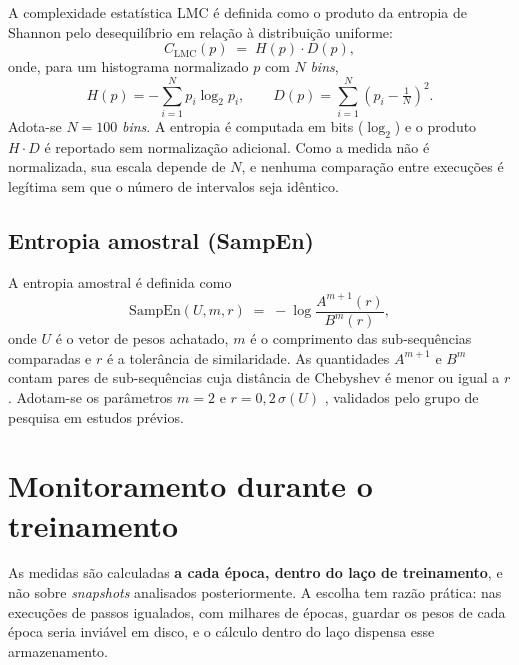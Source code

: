 A complexidade estatística LMC \cite{lmc1995} é definida como o produto
da entropia de Shannon \cite{shannon1948} pelo desequilíbrio em relação
à distribuição uniforme:
\begin{equation}
  C_{\mathrm{LMC}}(p) \;=\; H(p) \cdot D(p),
\end{equation}
onde, para um histograma normalizado $p$ com $N$ \emph{bins},
\begin{equation}
  H(p) = -\sum_{i=1}^{N} p_i \log_2 p_i, \qquad
  D(p) = \sum_{i=1}^{N} \left(p_i - \tfrac{1}{N}\right)^2.
\end{equation}
Adota-se $N = 100$ \emph{bins}. A entropia é computada em bits ($\log_2$)
e o produto $H \cdot D$ é reportado sem normalização adicional. Como a
medida não é normalizada, sua escala depende de $N$, e nenhuma comparação
entre execuções é legítima sem que o número de intervalos seja idêntico.


\subsection{Entropia amostral (SampEn)}
\label{sec:medidas-sampen}

A entropia amostral \cite{richman2000,pincus1991} é definida como
\begin{equation}
  \mathrm{SampEn}(U, m, r) \;=\;
  -\log \frac{A^{m+1}(r)}{B^{m}(r)},
\end{equation}
onde $U$ é o vetor de pesos achatado, $m$ é o comprimento das
sub-sequências comparadas e $r$ é a tolerância de similaridade. As
quantidades $A^{m+1}$ e $B^{m}$ contam pares de sub-sequências cuja
distância de Chebyshev é menor ou igual a $r$. Adotam-se os parâmetros
$m = 2$ e $r = 0{,}2\,\sigma(U)$ \cite{yentes2013}, validados pelo
grupo de pesquisa em estudos prévios.



\section{Monitoramento durante o treinamento}
\label{sec:monitor}

As medidas são calculadas \textbf{a cada época, dentro do laço de
treinamento}, e não sobre \emph{snapshots} analisados posteriormente. A escolha
tem razão prática: nas execuções de passos igualados, com milhares de épocas,
guardar os pesos de cada época seria inviável em disco, e o cálculo dentro do
laço dispensa esse armazenamento.

